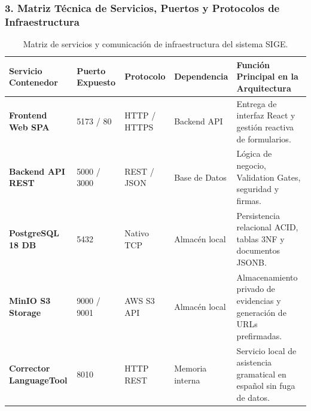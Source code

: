 \documentclass[12pt,a4paper]{article}
\begin{document}
\subsubsection*{3. Matriz Técnica de Servicios, Puertos y Protocolos de Infraestructura}
\begin{table}[H]
\centering
\small
\renewcommand{\arraystretch}{1.2}
\begin{tabularx}{\textwidth}{|>{\hsize=0.9\hsize\raggedright\arraybackslash\bfseries\footnotesize}X|>{\hsize=0.7\hsize\centering\arraybackslash\footnotesize}X|>{\hsize=0.7\hsize\centering\arraybackslash\footnotesize}X|>{\hsize=0.9\hsize\centering\arraybackslash\footnotesize}X|>{\hsize=1.8\hsize\raggedright\arraybackslash\footnotesize}X|}
\hline
\rowcolor{tableheader}
\textbf{Servicio Contenedor} & \textbf{Puerto Expuesto} & \textbf{Protocolo} & \textbf{Dependencia} & \textbf{Función Principal en la Arquitectura} \\
\hline
Frontend Web SPA & 5173 / 80 & HTTP / HTTPS & Backend API & Entrega de interfaz React y gestión reactiva de formularios. \\
\hline
Backend API REST & 5000 / 3000 & REST / JSON & Base de Datos & Lógica de negocio, Validation Gates, seguridad y firmas. \\
\hline
PostgreSQL 18 DB & 5432 & Nativo TCP & Almacén local & Persistencia relacional ACID, tablas 3NF y documentos JSONB. \\
\hline
MinIO S3 Storage & 9000 / 9001 & AWS S3 API & Almacén local & Almacenamiento privado de evidencias y generación de URLs prefirmadas. \\
\hline
Corrector LanguageTool & 8010 & HTTP REST & Memoria interna & Servicio local de asistencia gramatical en español sin fuga de datos. \\
\hline
\end{tabularx}
\caption{Matriz de servicios y comunicación de infraestructura del sistema SIGE.}
\end{table}
\end{document}
